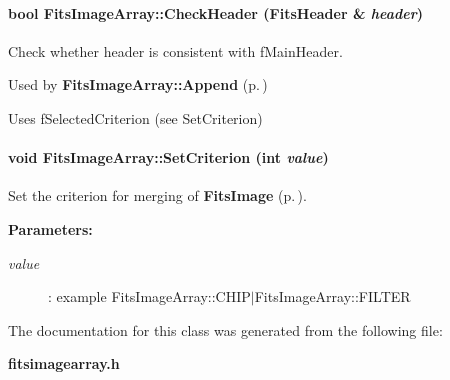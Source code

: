 \paragraph{\setlength{\rightskip}{0pt plus 5cm}bool Fits\-Image\-Array::Check\-Header ({\bf Fits\-Header} \& {\em header})}\hfill\label{class_fitsimagearray_a13}


Check whether header is consistent with f\-Main\-Header.

\begin{CompactItemize}
\item 
 Used by {\bf Fits\-Image\-Array::Append} {\rm (p.\,\pageref{class_fitsimagearray_a6})} \item 
 Uses f\-Selected\-Criterion (see Set\-Criterion) \end{CompactItemize}
\paragraph{\setlength{\rightskip}{0pt plus 5cm}void Fits\-Image\-Array::Set\-Criterion (int {\em value})\hspace{0.3cm}{\tt  [inline]}}\hfill\label{class_fitsimagearray_a10}


Set the criterion for merging of {\bf Fits\-Image} {\rm (p.\,\pageref{class_fitsimage})}.

\begin{Desc}
\item[{\bf Parameters: }]\par
\begin{description}
\item[
{\em value}]: example Fits\-Image\-Array::CHIP$|$Fits\-Image\-Array::FILTER \end{description}
\end{Desc}


The documentation for this class was generated from the following file:\begin{CompactItemize}
\item 
{\bf fitsimagearray.h}\end{CompactItemize}
